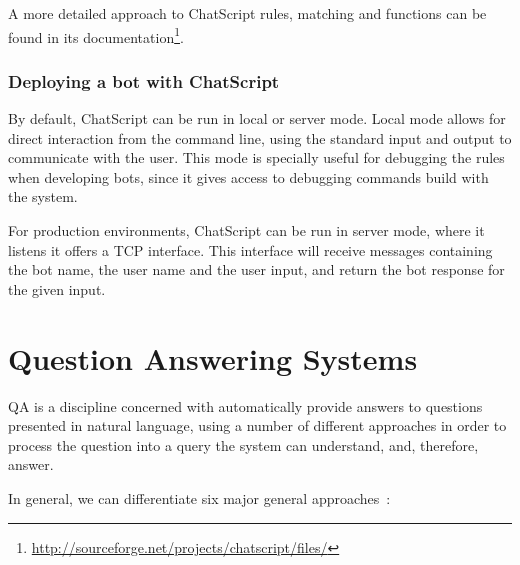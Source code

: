A more detailed approach to ChatScript rules, matching and functions can be found in its documentation\footnote{\url{http://sourceforge.net/projects/chatscript/files/}}.

\subsubsection{Deploying a bot with ChatScript}

By default, ChatScript can be run in local or server mode. Local mode allows for direct interaction from the command line, using the standard input and output to communicate with the user. This mode is specially useful for debugging the rules when developing bots, since it gives access to debugging commands build with the system.

For production environments, ChatScript can be run in server mode, where it listens it offers a TCP interface. This interface will receive messages containing the bot name, the user name and the user input, and return the bot response for the given input.

\section{Question Answering Systems}
\label{sec:qa_sys}

\ac{QA} is a discipline concerned with automatically provide answers to questions presented in natural language, using a number of different approaches in order to process the question into a query the system can understand, and, therefore, answer.

In general, we can differentiate six major general approaches~\cite{unger2014an}:

